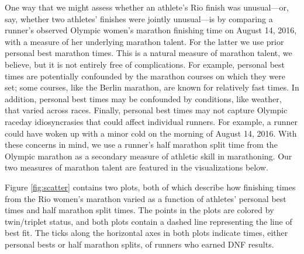 \documentclass[12pt,titlepage]{article}
\begin{document}
One way that we might assess whether an athlete's Rio finish was
unusual---or, say, whether two athletes' finishes were jointly
unusual---is by comparing a runner's observed Olympic women's marathon
finishing time on August 14, 2016, with a measure of her underlying
marathon talent.  For the latter we use prior personal best marathon
times.  This is a natural measure of marathon talent, we believe, but
it is not entirely free of complications.  For example, personal best
times are potentially confounded by the marathon courses on which they
were set; some courses, like the Berlin marathon, are known for
relatively fast times.  In addition, personal best times may be
confounded by conditions, like weather, that varied across races.
Finally, personal best times may not capture Olympic raceday
idiosyncrasies that could affect individual runners.  For example, a
runner could have woken up with a minor cold on the morning of August
14, 2016.  With these concerns in mind, we use a runner's half
marathon split time from the Olympic marathon as a secondary measure
of athletic skill in marathoning.  Our two measures of marathon talent
are featured in the visualizations below.

Figure \ref{fig:scatter} contains two plots, both of which describe
how finishing times from the Rio women's marathon varied as a function
of athletes' personal best times and half marathon split times.  The
points in the plots are colored by twin/triplet status, and both plots
contain %
a dashed line representing the line of best fit.
The ticks along the
horizontal axes in both plots indicate times, either personal bests or
half marathon splits, of runners who earned DNF
results.\label{scatterplots}
\end{document}
